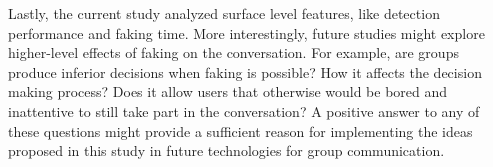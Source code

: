 \documentclass[]{simple-thesis}
\begin{document}
Lastly, the current study analyzed surface level features, like detection performance and faking time.
More interestingly, future studies might explore higher-level effects of faking on the conversation.
For example, are groups produce inferior decisions when faking is possible?
How it affects the decision making process?
Does it allow users that otherwise would be bored and inattentive to still take part in the conversation?
A positive answer to any of these questions might provide a sufficient reason for implementing the ideas proposed in this study in future technologies for group communication.


\cleardoublepage
{}
{}


\end{document}
